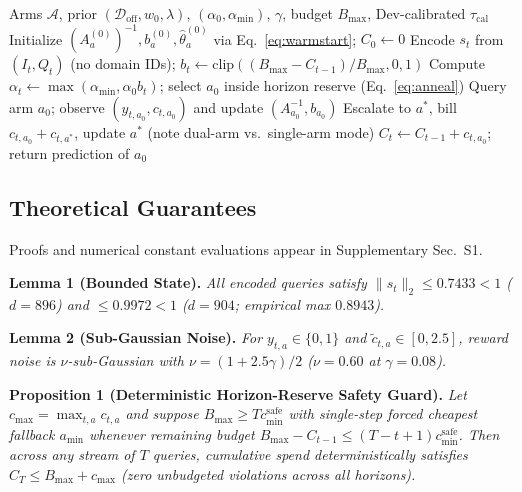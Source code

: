 \documentclass[10pt,twocolumn,letterpaper]{article}
\begin{document}
\begin{algorithm}[t]
\caption{CascadeRoute-VL Online Inference \& Guardrail}
\label{alg:cascaderoute}
\begin{algorithmic}[1]
\REQUIRE Arms $\mathcal{A}$, prior $(\mathcal{D}_{\text{off}}, w_0, \lambda)$, $(\alpha_0, \alpha_{\min})$, $\gamma$, budget $B_{\max}$, Dev-calibrated $\tau_{\text{cal}}$
\STATE Initialize $(A_a^{(0)})^{-1}, b_a^{(0)}, \hat{\theta}_a^{(0)}$ via Eq.~\eqref{eq:warmstart}; $C_0 \leftarrow 0$
    \STATE Encode $s_t$ from $(I_t, Q_t)$ (no domain IDs); $b_t \leftarrow \text{clip}((B_{\max}-C_{t-1})/B_{\max}, 0, 1)$
    \STATE Compute $\alpha_t \leftarrow \max(\alpha_{\min}, \alpha_0 b_t)$; select $a_0$ inside horizon reserve (Eq.~\eqref{eq:anneal})
    \STATE Query arm $a_0$; observe $(y_{t,a_0}, c_{t,a_0})$ and update $(A_{a_0}^{-1}, b_{a_0})$
        \STATE Escalate to $a^*$, bill $c_{t,a_0}{+}c_{t,a^*}$, update $a^*$ (note dual-arm vs.\ single-arm mode)
    \ELSE
        \STATE $C_t \leftarrow C_{t-1} + c_{t,a_0}$; return prediction of $a_0$
    \ENDIF
\ENDFOR
\end{algorithmic}
\end{algorithm}

\subsection{Theoretical Guarantees}
\label{sec:theory}

Proofs and numerical constant evaluations appear in Supplementary Sec.~S1.

\textbf{Lemma 1 (Bounded State).} \emph{All encoded queries satisfy $\|s_t\|_2 \le 0.7433 < 1$ ($d{=}896$) and $\le 0.9972 < 1$ ($d{=}904$; empirical max $0.8943$).}

\textbf{Lemma 2 (Sub-Gaussian Noise).} \emph{For $y_{t,a} \in \{0,1\}$ and $\tilde{c}_{t,a} \in [0, 2.5]$, reward noise is $\nu$-sub-Gaussian with $\nu = (1 + 2.5\gamma)/2$ ($\nu{=}0.60$ at $\gamma{=}0.08$).}

\textbf{Proposition 1 (Deterministic Horizon-Reserve Safety Guard).} \emph{Let $c_{\max} = \max_{t,a} c_{t,a}$ and suppose $B_{\max} \ge T c_{\min}^{\text{safe}}$ with single-step forced cheapest fallback $a_{\min}$ whenever remaining budget $B_{\max} - C_{t-1} \le (T - t + 1) c_{\min}^{\text{safe}}$. Then across any stream of $T$ queries, cumulative spend deterministically satisfies $C_T \le B_{\max} + c_{\max}$ (zero unbudgeted violations across all horizons).}
\end{document}
